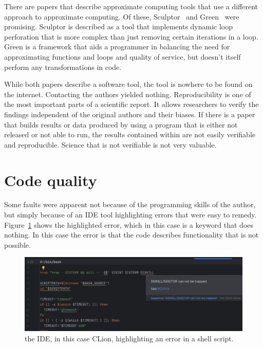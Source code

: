 There are papers that describe approximate computing tools that use a different approach to approximate computing. Of these, Sculptor~\citep{li2018sculptor} and Green~\citep{baek2010green} were promising. Sculptor is described as a tool that implements dynamic loop perforation that is more complex than just removing certain iterations in a loop. Green is a framework that aids a programmer in balancing the need for approximating functions and loops and quality of service, but doesn't itself perform any transformations in code. 

While both papers describe a software tool, the tool is nowhere to be found on the internet. Contacting the authors yielded nothing. 
Reproducibility is one of the most important parts of a scientific report.
It allows researchers to verify the findings independent of the original authors and their biases.
If there is a paper that builds results or data produced by using a program that is either not released or not able to run, the results contained within are not easily verifiable and reproducible. Science that is not verifiable is not very valuable.

\section{Code quality}


Some faults were apparent not because of the programming skills of the author, but simply because of an IDE tool highlighting errors that were easy to remedy. Figure~\ref{fig:IDE_highlighting} shows the highlighted error, which in this case is a keyword that does nothing. In this case the error is that the code describes functionality that is not possible.

\begin{figure}[h]
    \centering
    \includegraphics[width=\linewidth]{Images/IDE_highlighting.png}
    \caption{the IDE, in this case CLion, highlighting an error in a shell script.}
    \label{fig:IDE_highlighting}
\end{figure}

